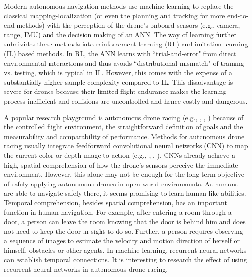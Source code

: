 Modern autonomous navigation methods use machine learning
to replace the classical mapping-localization 
(or even the planning and tracking for more end-to-end methods) 
with the perception of the drone's onboard sensors
(e.g., camera, range, IMU)
and the decision making of an ANN.
The way of learning further subdivides these methods into
reinforcement learning (RL) and imitation learning (IL) based methods.
In RL, the ANN learns with ``trial-and-error" \cite{Sadeghi2016}
from direct environmental interactions 
and thus avoids ``distributional mismatch" \cite{RobotAutonomy2}  
of training vs. testing, which is typical in IL.
However, this comes with the expense of a
substantially higher sample complexity 
compared to IL. \cite{Zhu2017}
This disadvantage is severe for drones because 
their limited flight endurance 
makes the learning process inefficient 
and collisions are uncontrolled and 
hence costly and dangerous. \cite{Sadeghi2016}

A popular research playground is autonomous drone racing
(e.g., \cite{Moon2019}, \cite{Jung2018}, \cite{Song2021})
because of the controlled flight environment,
the straightforward definition of goals
and the measurability and comparability of performance.
Methods for autonomous drone racing usually
integrate feedforward
convolutional neural networks (CNN) 
to map the current color or depth image to action
(e.g., \cite{RojasPerez2020}, \cite{Kaufmann2019}, \cite{Jung2018a}).
CNNs already achieve 
a high, spatial comprehension of how the drone's sensors perceive
the immediate environment.
However, this alone may not
be enough for the long-term objective of safely 
applying autonomous drones in open-world environments.
As humans are able to navigate safely there,
it seems promising to learn human-like abilities.
Temporal comprehension,
besides spatial comprehension,
has an important function in human navigation. 
For example, 
after entering a room through a door, 
a person can leave the room knowing 
that the door is behind him and 
does not need to keep the door in sight to do so.
Further, a person requires 
observing a sequence of images to
estimate the velocity and motion direction of herself or himself, 
obstacles or other agents.
In machine learning, recurrent neural networks
can establish temporal connections.
It is interesting to research the 
effect of using recurrent neural networks in autonomous drone racing.









